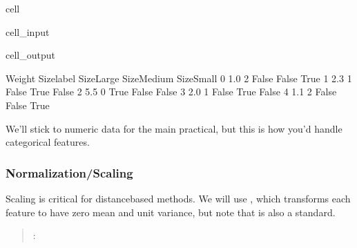 \documentclass[letterpaper,10pt,english]{jupyterBook}
\begin{document}
\begin{sphinxuseclass}{cell}\begin{sphinxVerbatimInput}

\begin{sphinxuseclass}{cell_input}
\begin{sphinxVerbatim}[commandchars=\\\{\}]
\end{sphinxVerbatim}

\end{sphinxuseclass}\end{sphinxVerbatimInput}
\begin{sphinxVerbatimOutput}

\begin{sphinxuseclass}{cell_output}
\begin{sphinxVerbatim}[commandchars=\\\{\}]
   Weight  Size\PYGZus{}label  Size\PYGZus{}Large  Size\PYGZus{}Medium  Size\PYGZus{}Small
0     1.0           2       False        False        True
1     2.3           1       False         True       False
2     5.5           0        True        False       False
3     2.0           1       False         True       False
4     1.1           2       False        False        True
\end{sphinxVerbatim}

\end{sphinxuseclass}\end{sphinxVerbatimOutput}

\end{sphinxuseclass}
\sphinxAtStartPar
We’ll stick to numeric data for the main practical, but this is how you’d handle categorical features.


\subsubsection{Normalization/Scaling}
\label{\detokenize{03:normalization-scaling}}
\sphinxAtStartPar
Scaling is critical for distance\sphinxhyphen{}based methods. We will use , which transforms each feature to have zero mean and unit variance, but note that  is also a standard.
\begin{quote}

\sphinxAtStartPar
{}: 
\end{quote}
\end{document}
